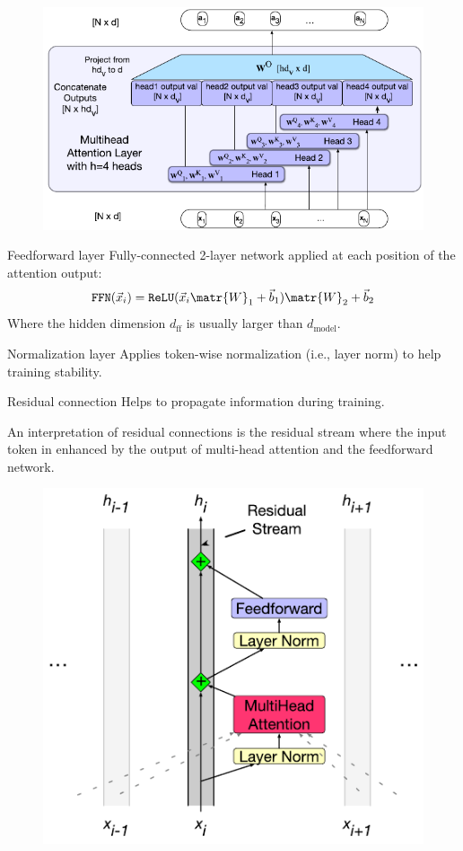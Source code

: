 \begin{description}
\begin{descriptionlist}
                \begin{figure}[H]
                    \centering
                    \includegraphics[width=0.5\linewidth]{./img/_multi_head_attention.pdf}
                \end{figure}

            \item[Feedforward layer]
                Fully-connected 2-layer network applied at each position of the attention output:
                \[ \texttt{FFN}(\vec{x}_i) = \texttt{ReLU}(\vec{x}_i\matr{W}_1 + \vec{b}_1)\matr{W}_2 + \vec{b}_2 \]
                Where the hidden dimension $d_\text{ff}$ is usually larger than $d_\text{model}$.

            \item[Normalization layer]
                Applies token-wise normalization (i.e., layer norm) to help training stability.

            \item[Residual connection]
                Helps to propagate information during training.

                \begin{remark}
                    An interpretation of residual connections is the residual stream where the input token in enhanced by the output of multi-head attention and the feedforward network.

                    \begin{figure}[H]
                        \centering
                        \includegraphics[width=0.38\linewidth]{./img/_residual_stream.pdf}
                    \end{figure}
                \end{remark}
        \end{descriptionlist}


\end{description}
